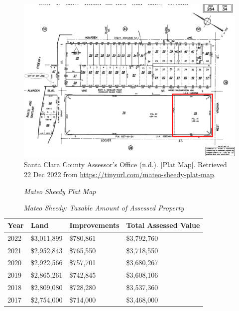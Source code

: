 \begin{figure}[hbt]
    \caption[Mateo Sheedy Plat Map]{\textit{Mateo Sheedy Plat Map}}\label{fig:mateo-sheedy-plat-map}
    \includegraphics[width=\textwidth]{Assessor-Info/mateo-sheedy-plat-map-264-34}\\ %
    \footnotesize{Santa Clara County Assessor's Office (n.d.). [Plat Map]. Retrieved 22 Dec 2022 from  \url{https://tinyurl.com/mateo-sheedy-plat-map}}.
\end{figure}

\begin{table}[hbt]
  \SingleSpacing%
  \caption[Mateo Sheedy: Taxable Amount of Assessed Propery]{\textit{Mateo Sheedy: Taxable Amount of Assessed Property}}\label{tab:mateo-sheedy-taxable-amount}
  \begin{tabular}{llll}
    \toprule
    Year & Land        & Improvements & Total Assessed Value \\
    \midrule
    2022 & \$3,011,899 & \$780,861    & \$3,792,760 \\
    2021 & \$2,952,843 & \$765,550    & \$3,718,550 \\
    2020 & \$2,922,566 & \$757,701    & \$3,680,267 \\
    2019 & \$2,865,261 & \$742,845    & \$3,608,106 \\
    2018 & \$2,809,080 & \$728,280    & \$3,537,360 \\
    2017 & \$2,754,000 & \$714,000    & \$3,468,000 \\
    \bottomrule
  \end{tabular}
\end{table}

